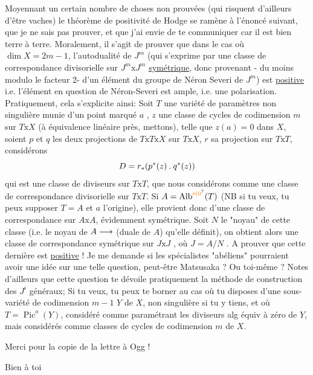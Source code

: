 Moyennant un certain nombre de choses non prouvées (qui risquent d'ailleurs d'être vaches) le théorème de positivité de Hodge se ramène à l'énoncé suivant, que je ne sais pas prouver, et que j'ai envie de te communiquer car il est bien terre à terre. Moralement, il s'agit de prouver que dans le cas où $\dim X=2m-1$, l'autodualité de $J^m$
(qui s'exprime par une classe de correspondance divisorielle sur $J^m\mathbin{\mathrm{x}}J^m$ \uline{symétrique}, donc provenant - du moins modulo le facteur 2-
d'un élément du groupe de Néron Severi de $J^m$) est \uline{positive} i.e. l'élément en question de Néron-Severi est ample, i.e. une polarisation. Pratiquement, cela s'explicite ainsi: Soit $T$ une variété de paramètres  non singulière munie d'un point marqué $a$ , $z$ une classe de cycles de codimension $m$ sur $T\mathbin{\mathrm{x}}X$ (à équivalence linéaire près, mettons), telle que $z(a)=0$ dans $X$, soient $p$ et $q$ les deux projections de $T\mathbin{\mathrm{x}}T\mathbin{\mathrm{x}}X$ sur $T\mathbin{\mathrm{x}}X$, $r$ sa projection sur $T\mathbin{\mathrm{x}}T$, considérons
\[
D=r_{*}(p^{*}(z)\mathbin{.}q^{*}(z))
\]
qui est une classe de diviseurs sur $T\mathbin{\mathrm{x}}T$, que nous considérons comme une classe de correspondance divisorielle sur $T\mathbin{\mathrm{x}}T$. Si $A=\operatorname{Alb}^{\unsure{o|0}}(T)$ (NB si tu veux, tu peux supposer $T=A$ et $a$ l'origine), elle provient donc d'une classe de correspondance sur $A\mathbin{\mathrm{x}}A$, évidemment symétrique. Soit $N$ le "noyau" de cette classe (i.e. le noyau de $A\longrightarrow$ (duale de $A$) qu'elle définit), on obtient alors une classe de correspondance symétrique sur $J\mathbin{\mathrm{x}}J$ , où $J=A/N$ . A prouver que cette dernière est \uline{positive} ! Je me demande si les spécialistes "abéliens" pourraient avoir une idée sur une telle question, peut-être Matsusaka ? Ou toi-même ? Notes d'ailleurs que cette question te dévoile pratiquement la méthode de construction des $J^i$ généraux; Si tu veux, tu peux te borner  au cas où tu disposes d'une sous-variété de codimension $m-1$ $Y$ de $X$, non singulière si tu y tiens,  et où $T=\operatorname{Pic}^{o}(Y)$, considéré comme paramétrant les diviseurs alg équiv à zéro de $Y$, mais considérés comme classes de cycles  de codimension $m$ de $X$.

Merci pour la copie de la lettre à Ogg !

Bien à toi\\
